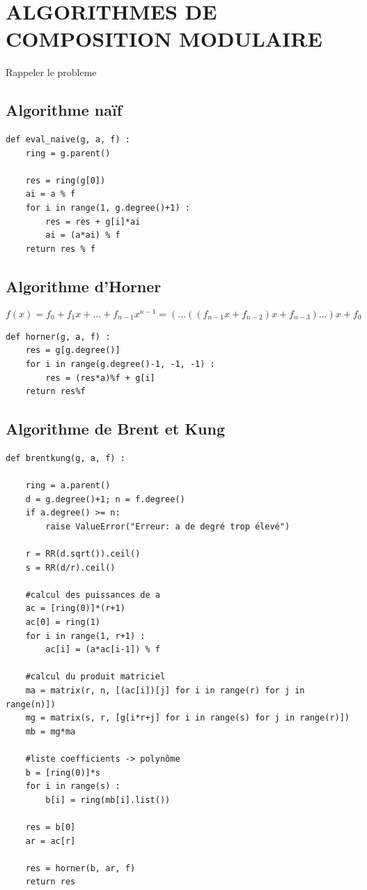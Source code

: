 \documentclass[a4paper]{article}
\begin{document}
\section{ALGORITHMES DE COMPOSITION MODULAIRE}

Rappeler le probleme

\subsection{Algorithme naïf}

\begin{lstlisting}[title={naive}]
def eval_naive(g, a, f) :
	ring = g.parent()

	res = ring(g[0])
	ai = a % f
	for i in range(1, g.degree()+1) :
		res = res + g[i]*ai
		ai = (a*ai) % f
	return res % f
\end{lstlisting}

\subsection{Algorithme d'Horner}

\[
f(x)=f_0+f_1x+...+f_{n-1}x^{n-1}= (...((f_{n-1}x+f_{n-2})x+f_{n-3})...)x+f_0    
\]

\begin{lstlisting}[title={Horner}]
def horner(g, a, f) :
    res = g[g.degree()]
    for i in range(g.degree()-1, -1, -1) :
        res = (res*a)%f + g[i]
    return res%f
\end{lstlisting}

\subsection{Algorithme de Brent et Kung}

\cite{BrentKung1978}

\begin{lstlisting}[title={brent and kung}]
def brentkung(g, a, f) :

	ring = a.parent()
	d = g.degree()+1; n = f.degree()
	if a.degree() >= n:
		raise ValueError("Erreur: a de degré trop élevé")

	r = RR(d.sqrt()).ceil()
	s = RR(d/r).ceil()

    #calcul des puissances de a
	ac = [ring(0)]*(r+1)
	ac[0] = ring(1)
	for i in range(1, r+1) :
		ac[i] = (a*ac[i-1]) % f

    #calcul du produit matriciel
	ma = matrix(r, n, [(ac[i])[j] for i in range(r) for j in range(n)])
	mg = matrix(s, r, [g[i*r+j] for i in range(s) for j in range(r)])
	mb = mg*ma

    #liste coefficients -> polynôme
	b = [ring(0)]*s
	for i in range(s) :
		b[i] = ring(mb[i].list())

	res = b[0]
	ar = ac[r]

	res = horner(b, ar, f)
	return res
\end{lstlisting}
\end{document}
